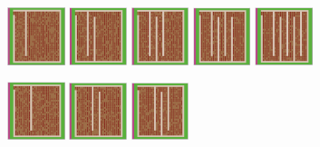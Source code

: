 \documentclass[12pt,letterpaper]{article}
\begin{document}
\begin{figure}[ht]
\begin{minipage}[b]{\linewidth}
  \end{minipage}
  \begin{minipage}[b]{\linewidth}
    \includegraphics[width=0.15\textwidth]{./figures/chokepoint_2_a.png}
    \includegraphics[width=0.15\textwidth]{./figures/chokepoint_2_b.png}
    \includegraphics[width=0.15\textwidth]{./figures/chokepoint_2_c.png}
    \includegraphics[width=0.15\textwidth]{./figures/chokepoint_2_d.png}
    \includegraphics[width=0.15\textwidth]{./figures/chokepoint_2_e.png}
  \end{minipage}
  \begin{minipage}[b]{\linewidth}
    \includegraphics[width=0.15\textwidth]{./figures/chokepoint_3_a.png}
    \includegraphics[width=0.15\textwidth]{./figures/chokepoint_3_b.png}
    \includegraphics[width=0.15\textwidth]{./figures/chokepoint_3_c.png}

\end{minipage}
\end{figure}
\end{document}
